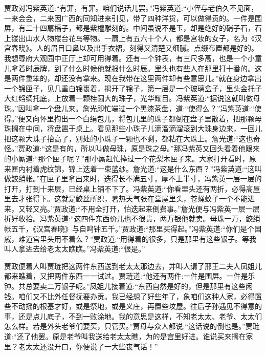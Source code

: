 \begin{parag}
    贾政对冯紫英道:“有罪，有罪。咱们说话儿罢。”冯紫英道:“小侄与老伯久不见面，一来会会，二来因广西的同知进来引见，带了四种洋货，可以做得贡的。一件是围屏，有二十四扇槅子，都是紫檀雕刻的。中间虽说不是玉，却是绝好的硝子石，石上镂出山水人物楼台花鸟等物。一扇上有五六十个人，都是宫妆的女子，名为《汉宫春晓》。人的眉目口鼻以及出手衣褶，刻得又清楚又细腻。点缀布置都是好的。我想尊府大观园中正厅上却可用得着。还有一个钟表，有三尺多高，也是一个小童儿拿着时辰牌，到了什么时候他就报什么时辰。里头也有些人在那里打十番的。这是两件重笨的，却还没有拿来。现在我带在这里两件却有些意思儿。”就在身边拿出一个锦匣子，见几重白锦裹着，揭开了锦子，第一层是一个玻璃盒子，里头金托子大红绉绸托底，上放着一颗桂圆大的珠子，光华耀目。冯紫英道:“据说这就叫做母珠。”因叫拿一个盘儿来。詹光即忙端过一个黑漆茶盘，道:“使得么？”冯紫英道:“使得。”便又向怀里掏出一个白绢包儿，将包儿里的珠子都倒在盘子里散着，把那颗母珠搁在中间，将盘置于桌上。看见那些小珠子儿滴溜滴溜滚到大珠身边来，一回儿把这颗大珠子抬高了，别处的小珠子一颗也不剩，都粘在大珠上。詹光道:“这也奇怪。”贾政道:“这是有的，所以叫做母珠，原是珠之母。”那冯紫英又回头看着他跟来的小厮道:“那个匣子呢？”那小厮赶忙捧过一个花梨木匣子来。大家打开看时，原来匣内衬着虎纹锦，锦上迭着一束蓝纱。詹光道:“这是什么东西？”冯紫英道:“这叫做鲛绡帐。”在匣子里拿出来时，迭得长不满五寸，厚不上半寸，冯紫英一层一层的打开，打到十来层，已经桌上铺不下了。冯紫英道:“你看里头还有两折，必得高屋里去才张得下。这就是鲛丝所织，暑热天气张在堂屋里头，苍蝇蚊子一个不能进来，又轻又亮。”贾政道:“不用全打开，怕迭起来倒费事。”詹光便与冯紫英一层一层折好收拾。冯紫英道:“这四件东西价儿也不很贵，两万银他就卖。母珠一万，鲛绡帐五千，《汉宫春晓》与自鸣钟五千。”贾政道:“那里买得起。”冯紫英道:“你们是个国戚，难道宫里头用不着么？”贾政道:“用得着的很多，只是那里有这些银子。等我叫人拿进去给老太太瞧瞧。”冯紫英道:“很是。”
\end{parag}


\begin{parag}
    贾政便着人叫贾琏把这两件东西送到老太太那边去，并叫人请了邢王二夫人凤姐儿都来瞧着，又把两件东西一一试过。贾琏道:“他还有两件:一件是围屏。一件是乐钟。共总要卖二万银子呢。”凤姐儿接着道:“东西自然是好的，但是那里有这些闲钱。咱们又不比外任督抚要办贡。我已经想了好些年了，象咱们这种人家，必得置些不动摇的根基才好，或是祭地，或是义庄，再置些坟屋。往后子孙遇见不得意的事，还是点儿底子，不到一败涂地。我的意思是这样，不知老太太、老爷、太太们怎么样。若是外头老爷们要买，只管买。”贾母与众人都说:“这话说的倒也是。”贾琏道:“还了他罢。原是老爷叫我送给老太太瞧，为的是宫里好进。谁说买来搁在家里？老太太还没开口，你便说了一大些丧气话！”
\end{parag}


